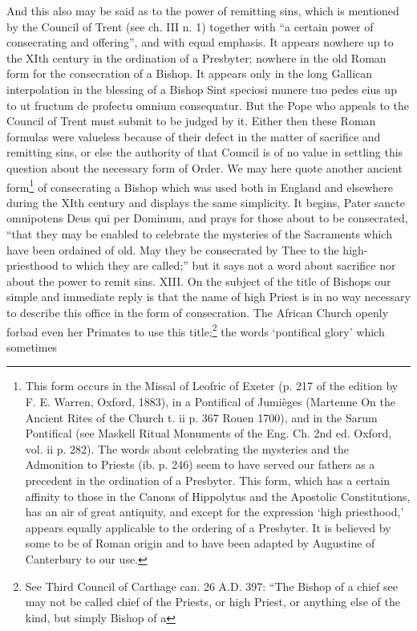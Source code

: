 And this also may be said as to the power of remitting sins, which is mentioned by the Council of Trent (see ch. III n. 1) together with “a certain power of consecrating and offering”, and with equal emphasis. It appears nowhere up to the XIth century in the ordination of a Presbyter; nowhere in the old Roman form for the consecration of a Bishop. It appears only in the long Gallican interpolation in the blessing of a Bishop Sint speciosi munere tuo pedes eius up to ut fructum de profectu omnium consequatur. But the Pope who appeals to the Council of Trent must submit to be judged by it. Either then these Roman formulas were valueless because of their defect in the matter of sacrifice and remitting sins, or else the authority of that Council is of no value in settling this question about the necessary form of Order. We may here quote another ancient form\footnote{This form occurs in the Missal of Leofric of Exeter (p. 217 of the edition by F. E. Warren, Oxford, 1883), in a Pontifical of Jumièges (Martenne On the Ancient Rites of the Church t. ii p. 367 Rouen 1700), and in the Sarum Pontifical (see Maskell Ritual Monuments of the Eng. Ch. 2nd ed. Oxford, vol. ii p. 282). The words about celebrating the mysteries and the Admonition to Priests (ib. p. 246) seem to have served our fathers as a precedent in the ordination of a Presbyter. This form, which has a certain affinity to those in the Canons of Hippolytus and the Apostolic Constitutions, has an air of great antiquity, and except for the expression ‘high priesthood,’ appears equally applicable to the ordering of a Presbyter. It is believed by some to be of Roman origin and to have been adapted by Augustine of Canterbury to our use.} of consecrating a Bishop which was used both in England and elsewhere during the XIth century and displays the same simplicity. It begins, Pater sancte omnipotens Deus qui per Dominum, and prays for those about to be consecrated, “that they may be enabled to celebrate the mysteries of the Sacraments which have been ordained of old. May they be consecrated by Thee to the high-priesthood to which they are called;” but it says not a word about sacrifice nor about the power to remit sins. XIII. On the subject of the title of Bishops our simple and immediate reply is that the name of high Priest is in no way necessary to describe this office in the form of consecration. The African Church openly forbad even her Primates to use this title;\footnote{See Third Council of Carthage can. 26 A.D. 397: “The Bishop of a chief see may not be called chief of the Priests, or high Priest, or anything else of the kind, but simply Bishop of a} the words ‘pontifical glory’ which sometimes


